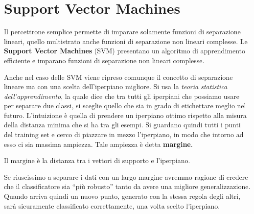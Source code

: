 \chapter{Support Vector Machines}
Il percettrone semplice permette di imparare solamente funzioni di separazione
lineari, quello multistrato anche funzioni di separazione non lineari complesse.
Le \textbf{Support Vector Machines} (SVM) presentano un algoritmo di apprendimento
efficiente e imparano funzioni di separazione non lineari complesse.

Anche nel caso delle SVM viene ripreso comunque il concetto di separazione lineare
ma con una scelta dell'iperpiano migliore. Si usa la \textit{teoria statistica dell'apprendimento},
la quale dice che tra tutti gli iperpiani che possiamo usare per separare due classi,
si sceglie quello che sia in grado di etichettare meglio nel futuro. L'intuizione
è quella di prendere un iperpiano ottimo rispetto alla misura della distanza minima
che si ha tra gli esempi. Si guardano quindi tutti i punti del training set e
cerco di piazzare in mezzo l'iperpiano, in modo che intorno ad esso ci sia massima
ampiezza. Tale ampiezza è detta \textbf{margine}.
\begin{definizione}
    Il margine è la distanza tra i vettori di supporto e l'iperpiano.
\end{definizione}

Se riuscissimo a separare i dati con un largo margine avremmo ragione di credere
che il classificatore sia “più robusto” tanto da avere una migliore generalizzazione.
Quando arriva quindi un nuovo punto, generato con la stessa regola degli altri,
sarà sicuramente classificato correttamente, una volta scelto l'iperpiano.

